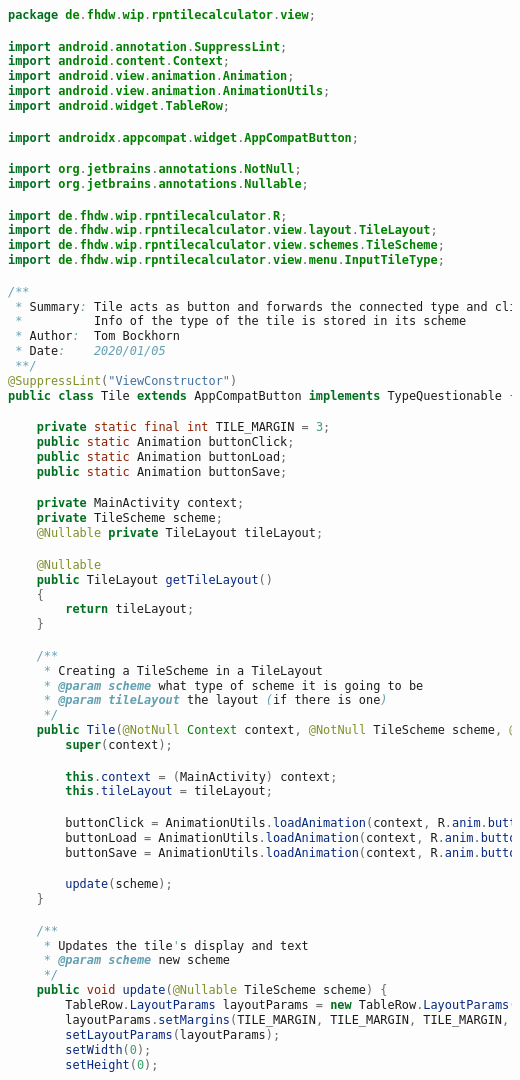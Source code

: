 \begin{lstlisting}[caption=Tile,label=list:Tile,language=Java]
package de.fhdw.wip.rpntilecalculator.view;

import android.annotation.SuppressLint;
import android.content.Context;
import android.view.animation.Animation;
import android.view.animation.AnimationUtils;
import android.widget.TableRow;

import androidx.appcompat.widget.AppCompatButton;

import org.jetbrains.annotations.NotNull;
import org.jetbrains.annotations.Nullable;

import de.fhdw.wip.rpntilecalculator.R;
import de.fhdw.wip.rpntilecalculator.view.layout.TileLayout;
import de.fhdw.wip.rpntilecalculator.view.schemes.TileScheme;
import de.fhdw.wip.rpntilecalculator.view.menu.InputTileType;

/**
 * Summary: Tile acts as button and forwards the connected type and click to the handler
 *          Info of the type of the tile is stored in its scheme
 * Author:  Tom Bockhorn
 * Date:    2020/01/05
 **/
@SuppressLint("ViewConstructor")
public class Tile extends AppCompatButton implements TypeQuestionable {

    private static final int TILE_MARGIN = 3;
    public static Animation buttonClick;
    public static Animation buttonLoad;
    public static Animation buttonSave;

    private MainActivity context;
    private TileScheme scheme;
    @Nullable private TileLayout tileLayout;

    @Nullable
    public TileLayout getTileLayout()
    {
        return tileLayout;
    }

    /**
     * Creating a TileScheme in a TileLayout
     * @param scheme what type of scheme it is going to be
     * @param tileLayout the layout (if there is one)
     */
    public Tile(@NotNull Context context, @NotNull TileScheme scheme, @Nullable TileLayout tileLayout) {
        super(context);

        this.context = (MainActivity) context;
        this.tileLayout = tileLayout;

        buttonClick = AnimationUtils.loadAnimation(context, R.anim.button_bounce);
        buttonLoad = AnimationUtils.loadAnimation(context, R.anim.button_load);
        buttonSave = AnimationUtils.loadAnimation(context, R.anim.button_save);

        update(scheme);
    }

    /**
     * Updates the tile's display and text
     * @param scheme new scheme
     */
    public void update(@Nullable TileScheme scheme) {
        TableRow.LayoutParams layoutParams = new TableRow.LayoutParams(TableRow.LayoutParams.MATCH_PARENT, TableRow.LayoutParams.MATCH_PARENT, 1.0f);
        layoutParams.setMargins(TILE_MARGIN, TILE_MARGIN, TILE_MARGIN, TILE_MARGIN);
        setLayoutParams(layoutParams);
        setWidth(0);
        setHeight(0);


\end{lstlisting}
